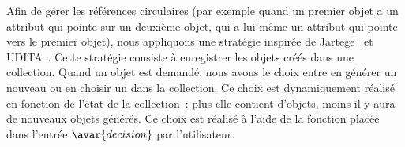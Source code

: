 Afin de gérer les références circulaires (par exemple quand un premier objet a
un attribut qui pointe sur un deuxième objet, qui a lui-même un attribut qui
pointe vers le premier objet), nous appliquons une stratégie inspirée de
Jartege~ et UDITA~. Cette stratégie
consiste à enregistrer les objets créés dans une collection. Quand un objet est
demandé, nous avons le choix entre en générer un nouveau ou en choisir un dans
la collection. Ce choix est dynamiquement réalisé en fonction de l'état de la
collection~: plus elle contient d'objets, moins il y aura de nouveaux objets
générés. Ce choix est réalisé à l'aide de la fonction placée dans l'entrée
$\avar{decision}$ par l'utilisateur.
